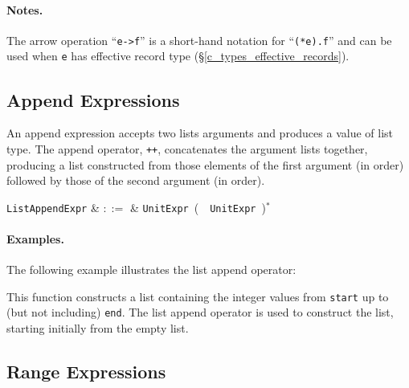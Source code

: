 \paragraph{Notes.} The arrow operation ``\lstinline{e->f}'' is a short-hand notation for ``\lstinline{(*e).f}'' and can be used when \lstinline{e} has effective record type (\S\ref{c_types_effective_records}).


\subsection{Append Expressions}
\label{c_expr_append}

An append expression accepts two lists arguments and produces a value of list type.  The append operator, \lstinline{++}, concatenates the argument lists together, producing a list constructed from those elements of the first argument (in order) followed by those of the second argument (in order).

\begin{syntax}
  \verb+ListAppendExpr+ & $::=$ & \verb+UnitExpr+\ \big(\ \token{++}\
  \verb+UnitExpr+\ \big)$^*$\\
\end{syntax}

\paragraph{Examples.} The following example illustrates the list append operator:



This function constructs a list containing the integer values from \lstinline{start} up to (but not including) \lstinline{end}.  The list append operator is used to construct the list, starting initially from the empty list.


\subsection{Range Expressions}
\label{c_expr_range}

